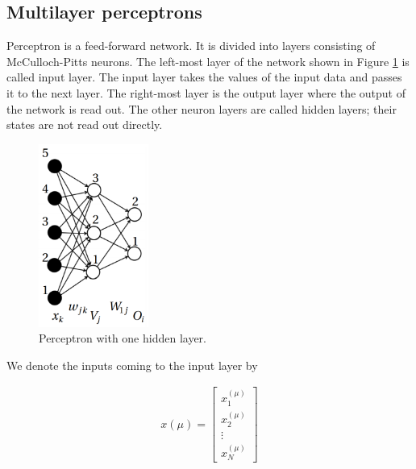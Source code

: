 \newpage

\subsection{Multilayer perceptrons}

Perceptron is a feed-forward network. It is divided into layers consisting of McCulloch-Pitts neurons. The left-most layer of the network shown in Figure \ref{perceptron} is called input layer. The input layer takes the values of the input data and passes it to the next layer. The right-most layer is the output layer where the output of the network is read out. The other neuron layers are called hidden layers; their states are not read out directly. \cite{mehlig}

\vspace{3mm}
\begin{figure}[htb]
	\begin{center}
		\includegraphics*[height=6cm, keepaspectratio]{obr/perceptron.png}
	\end{center}
	\vspace{3mm}
	\caption{Perceptron with one hidden layer. \cite{mehlig}} 
	\label{perceptron}
\end{figure}

 \cite{mehlig} We denote the inputs coming to the input layer by \cite{mehlig}

\begin{gather}
	x(\mu)= 
	\begin{bmatrix}
	x_{1}^{(\mu)} \\
	x_{2}^{(\mu)} \\
	\vdots \\
	x_{N}^{(\mu)} 
	\end{bmatrix}
\end{gather}


